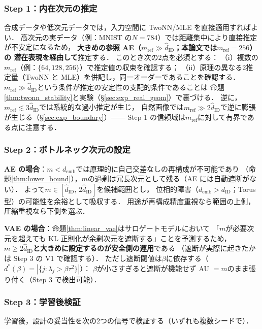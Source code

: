 \documentclass[11pt,a4paper]{jsarticle}
\newcommand{\dID}{d_{\mathrm{ID}}}
\newcommand{\hatdID}{\hat{d}_{\mathrm{ID}}}
\newcommand{\demb}{d_{\mathrm{emb}}}
\newcommand{\dstar}{d^{*}(\beta)}
\begin{document}
\subsubsection{Step 1：内在次元の推定}\label{sec:protocol_s1}

合成データや低次元データでは，入力空間に TwoNN/MLE を直接適用すればよい．
高次元の実データ（例：MNIST の$N = 784$）では距離集中により直接推定が不安定になるため，
\textbf{大きめの参照 AE（$m_{\mathrm{ref}} \gg \hatdID$；本論文では$m_{\mathrm{ref}} = 256$）の
潜在表現を経由して}推定する．
このとき次の2点を必須とする：
（i）複数の$m_{\mathrm{ref}}$（例：$\{64, 128, 256\}$）で推定値の収束を確認する；
（ii）原理の異なる2推定量（TwoNN と MLE）を併記し，同一オーダーであることを確認する．
$m_{\mathrm{ref}} \gg \hatdID$という条件が推定の安定性の支配的条件であることは
命題\ref{thm:twonn_stability}と実験（§\ref{sec:exp_real_geom}）で裏づける．
逆に，$m_{\mathrm{ref}} \lesssim 3\hatdID$では系統的な過小推定が生じ，
自然画像では$m_{\mathrm{ref}} \gg 2\hatdID$で逆に膨張が生じる（§\ref{sec:exp_boundary}）——
Step 1 の信頼域は$m_{\mathrm{ref}}$に対して有界である点に注意する．

\subsubsection{Step 2：ボトルネック次元の設定}\label{sec:protocol_s2}

\textbf{AE の場合}：$m < \demb$では原理的に自己交差なしの再構成が不可能であり
（命題\ref{thm:lower_bound}），$m$の過剰は冗長次元として残る（AE には自動遮断がない）．
よって$m \in [\hatdID,\, 2\hatdID]$を候補範囲とし，
位相的障害（$\demb > \dID$；Torus 型）の可能性を余裕として吸収する．
用途が再構成精度重視なら範囲の上側，圧縮重視なら下側を選ぶ．

\textbf{VAE の場合}：命題\ref{thm:linear_vae}はサロゲートモデルにおいて
「$m$が必要次元を超えても KL 正則化が余剰次元を遮断する」ことを予測するため，
\textbf{$m \geq 2\hatdID$と大きめに設定するのが安全側の運用}である
（遮断が実際に起きたかは Step 3 の V1 で確認する）．
ただし遮断閾値は$\beta$に依存する（$\dstar = |\{j : \lambda_j > \beta\tau^2\}|$）：
$\beta$が小さすぎると遮断が機能せず AU $= m$のまま張り付く（Step 3 で検出可能）．

\subsubsection{Step 3：学習後検証}\label{sec:protocol_s3}

学習後，設計の妥当性を次の2つの信号で検証する（いずれも複数シードで）．
\end{document}

